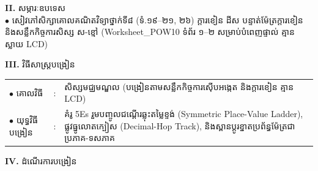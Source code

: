 \documentclass[a4paper,10pt]{article}
\newcommand{\en}[1]{{\TimesEn #1}}
\begin{document}
{\vspace{2pt}

\textbf{II.} {\muol សម្ភារៈឧបទេស}\\[1pt]
\hspace*{0.55cm}$\bullet$ \hspace{0.35cm} សៀវភៅសិក្សាគោលគណិតវិទ្យាថ្នាក់ទី៨ (ទំ.១៩–២១, ២៦) ក្ដារខៀន ដីស បន្ទាត់ម៉ែត្រក្ដារខៀន និងសន្លឹកកិច្ចការសិស្ស ស-ខ្មៅ (\en{Worksheet\_POW10} ទំព័រ ១–២ សម្រាប់បំពេញផ្ទាល់ គ្មានស្លាយ \en{LCD})

\vspace{2pt}

\textbf{III.} {\muol វិធីសាស្រ្តបង្រៀន}\\[1pt]
\hspace*{0.45cm}%
\begin{tabular}{@{}l l L{14.85cm}@{}}
  $\bullet$ \hspace{0.25cm} គោលវិធី & : & សិស្សមជ្ឈមណ្ឌល (បង្រៀនតាមសន្លឹកកិច្ចការស៊ើបអង្កេត និងក្ដារខៀន គ្មាន \en{LCD}) \\
  $\bullet$ \hspace{0.25cm} យុទ្ធវិធីបង្រៀន & : & គំរូ \en{5Es} រួមបញ្ចូលជណ្ដើរឆ្លុះតម្លៃខ្ទង់ (\en{Symmetric Place-Value Ladder}), ផ្លូវធ្នូលោតក្បៀស (\en{Decimal-Hop Track}), និងស្ពានប្ដូរខ្នាតប្រព័ន្ធម៉ែត្រជាប្រភាគ-ទសភាគ \\
\end{tabular}
}

\vspace{2pt}

\textbf{IV.} {\muol ដំណើរការបង្រៀន}

\vspace{1pt}
\end{document}
